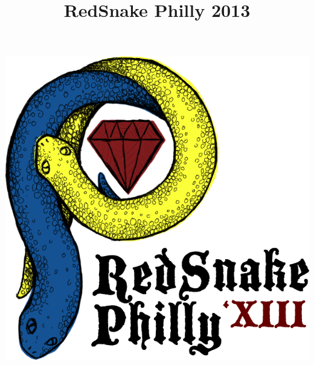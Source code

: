 \documentclass[xcolor=dvipsnames,red]{beamer}
\title{RedSnake Philly 2013}
\date{}
\begin{document}
\begin{frame}[plain]
\begin{center}
\includegraphics[width=.75\textwidth]{imgs/redsnakephilly2013logo.png}
\end{center}
\end{frame}
\end{document}

